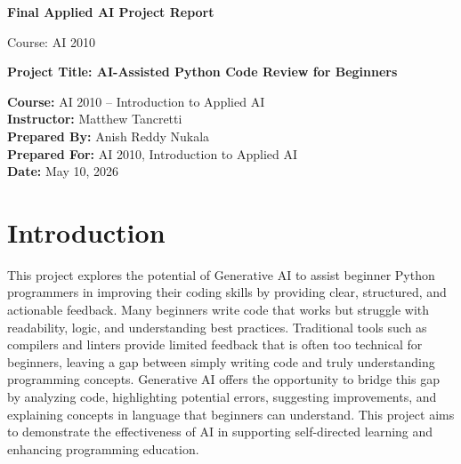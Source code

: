 \documentclass[12pt]{article}
\begin{document}
\begin{titlepage}
    \centering
    \vspace*{1.4in}

    {\LARGE\bfseries Final Applied AI Project Report\par}
    \vspace{0.7in}

    {\large Course: AI 2010\par}
    \vspace{0.3in}

    {\Large\bfseries Project Title: AI-Assisted Python Code Review for Beginners\par}
    \vspace{0.8in}

    \begin{flushleft}
    \large
    \textbf{Course:} AI 2010 -- Introduction to Applied AI\\[0.25in]
    \textbf{Instructor:} Matthew Tancretti\\[0.25in]
    \textbf{Prepared By:} Anish Reddy Nukala\\[0.25in]
    \textbf{Prepared For:} AI 2010, Introduction to Applied AI\\[0.25in]
    \textbf{Date:} May 10, 2026
    \end{flushleft}

    \vfill
\end{titlepage}

\section*{Introduction}

This project explores the potential of Generative AI to assist beginner Python programmers in improving their coding skills by providing clear, structured, and actionable feedback. Many beginners write code that works but struggle with readability, logic, and understanding best practices. Traditional tools such as compilers and linters provide limited feedback that is often too technical for beginners, leaving a gap between simply writing code and truly understanding programming concepts. Generative AI offers the opportunity to bridge this gap by analyzing code, highlighting potential errors, suggesting improvements, and explaining concepts in language that beginners can understand. This project aims to demonstrate the effectiveness of AI in supporting self-directed learning and enhancing programming education.
\end{document}
